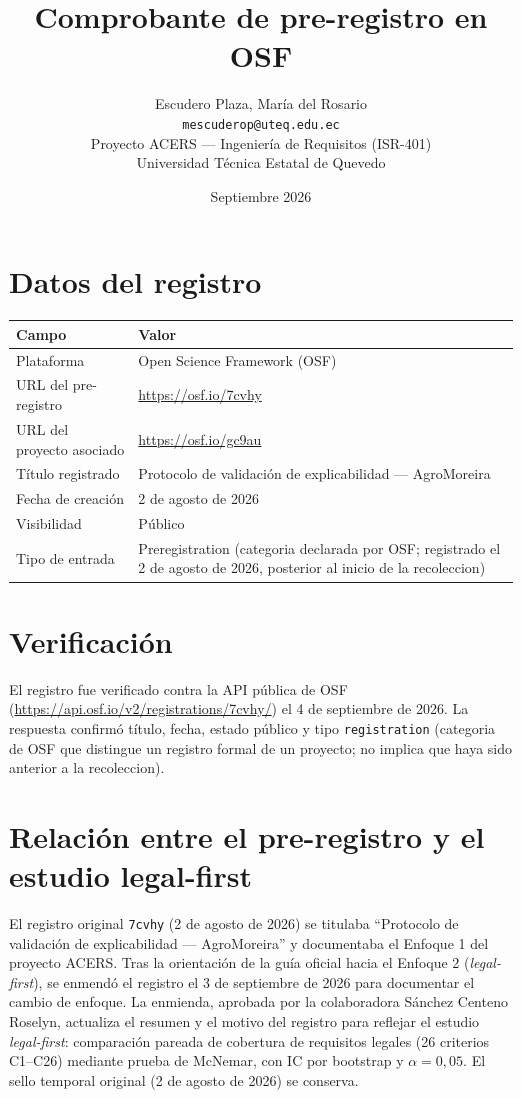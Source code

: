 \documentclass[11pt,a4paper]{article}
\title{\textbf{Comprobante de pre-registro en OSF}}
\author{Escudero Plaza, Mar\'{i}a del Rosario\\
\texttt{mescuderop@uteq.edu.ec}\\
\vspace{0.3em}
\small Proyecto ACERS --- Ingenier\'{i}a de Requisitos (ISR-401)\\
\small Universidad T\'{e}cnica Estatal de Quevedo}
\date{Septiembre 2026}
\begin{document}
\maketitle
\thispagestyle{empty}

\section*{Datos del registro}

\begin{tabular}{@{}p{5cm}p{9cm}@{}}
\toprule
\textbf{Campo} & \textbf{Valor} \\
\midrule
Plataforma & Open Science Framework (OSF) \\
URL del pre-registro & \url{https://osf.io/7cvhy} \\
URL del proyecto asociado & \url{https://osf.io/gc9au} \\
T\'{i}tulo registrado & Protocolo de validaci\'{o}n de explicabilidad --- AgroMoreira \\
Fecha de creaci\'{o}n & 2 de agosto de 2026 \\
Visibilidad & P\'{u}blico \\
Tipo de entrada & Preregistration (categoria declarada por OSF; registrado el 2 de agosto de 2026, posterior al inicio de la recoleccion) \\
\bottomrule
\end{tabular}

\section*{Verificaci\'{o}n}

El registro fue verificado contra la API p\'{u}blica de OSF
(\url{https://api.osf.io/v2/registrations/7cvhy/}) el 4 de septiembre de 2026.
La respuesta confirm\'{o} t\'{i}tulo, fecha, estado p\'{u}blico y tipo
\texttt{registration} (categoria de OSF que distingue un registro formal de un
proyecto; no implica que haya sido anterior a la recoleccion).

\section*{Relaci\'{o}n entre el pre-registro y el estudio legal-first}

El registro original \texttt{7cvhy} (2 de agosto de 2026) se titulaba
``Protocolo de validaci\'{o}n de explicabilidad --- AgroMoreira'' y documentaba
el Enfoque 1 del proyecto ACERS. Tras la orientaci\'{o}n de la gu\'{i}a oficial
hacia el Enfoque 2 (\emph{legal-first}), se enmend\'{o} el registro el 3 de
septiembre de 2026 para documentar el cambio de enfoque. La enmienda, aprobada
por la colaboradora S\'{a}nchez Centeno Roselyn, actualiza el resumen y el
motivo del registro para reflejar el estudio \emph{legal-first}: comparaci\'{o}n
pareada de cobertura de requisitos legales (26 criterios C1--C26) mediante
prueba de McNemar, con IC por bootstrap y $\alpha = 0{,}05$. El sello temporal
original (2 de agosto de 2026) se conserva.
\end{document}
